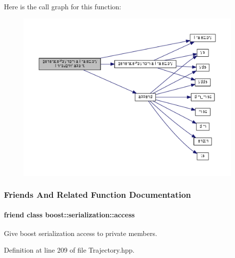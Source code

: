 Here is the call graph for this function\+:
\nopagebreak
\begin{figure}[H]
\begin{center}
\leavevmode
\includegraphics[width=350pt]{classDmpBbo_1_1Trajectory_a8e4bc03c6f535f4c9983ffe77a2d971b_cgraph}
\end{center}
\end{figure}




\subsubsection{Friends And Related Function Documentation}
\hypertarget{classDmpBbo_1_1Trajectory_ac98d07dd8f7b70e16ccb9a01abf56b9c}{
\paragraph[{boost\+::serialization\+::access}]{\setlength{\rightskip}{0pt plus 5cm}friend class boost\+::serialization\+::access\hspace{0.3cm}{\ttfamily [friend]}}}\label{classDmpBbo_1_1Trajectory_ac98d07dd8f7b70e16ccb9a01abf56b9c}


Give boost serialization access to private members. 



Definition at line 209 of file Trajectory.\+hpp.

